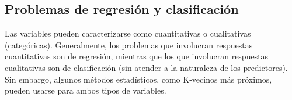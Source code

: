 \subsection{Problemas de regresión y clasificación}

Las variables pueden caracterizarse como cuantitativas o cualitativas (categóricas). Generalmente, los problemas que involucran respuestas cuantitativas son de regresión, mientras que los que involucran respuestas cualitativas son de clasificación (sin atender a la naturaleza de los predictores). Sin embargo, algunos métodos estadísticos, como K-vecinos más próximos, pueden usarse para ambos tipos de variables. 
